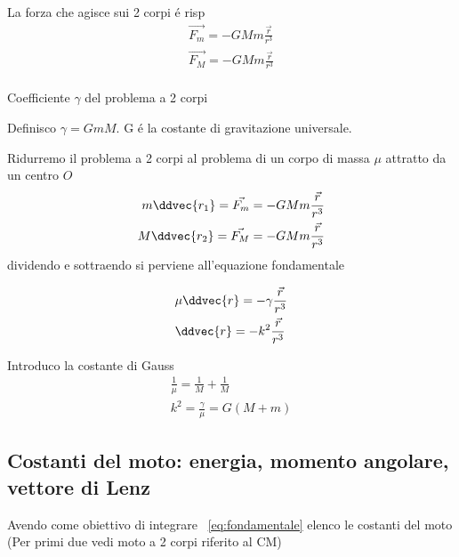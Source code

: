 La forza che agisce sui 2 corpi \'e risp
\begin{align*}
\vec{F_m}=-GMm\frac{\vec{r}}{r^3}\\
\vec{F_M}=-GMm\frac{\vec{r}}{r^3}\\
\end{align*}

\begin{definition}{Coefficiente $\gamma$ del problema a 2 corpi}

Definisco $\gamma=GmM$. G \'e la costante di gravitazione universale.

\end{definition}


Ridurremo il problema a 2 corpi al problema di un corpo di massa $\mu$ attratto da un centro $O$
\begin{align*}
m\ddvec{r_1}=\vec{F_m}=-GMm\frac{\vec{r}}{r^3}\\
M\ddvec{r_2}=\vec{F_M}=-GMm\frac{\vec{r}}{r^3}\\
\end{align*}
dividendo e sottraendo si perviene all'equazione fondamentale

\begin{align}
&\mu\ddvec{r}=-\gamma\frac{\vec{r}}{r^3}\label{eq:fondamentale}\\
&\ddvec{r}=-k^2\frac{\vec{r}}{r^3}
\end{align}

Introduco la costante di Gauss
\begin{align*}
\frac{1}{\mu}=\frac{1}{M}+\frac{1}{M}\\
k^2=\frac{\gamma}{\mu}=G(M+m)
\end{align*}

\subsection{Costanti del moto: energia, momento angolare, vettore di Lenz}
Avendo come obiettivo di integrare ~\ref{eq:fondamentale} elenco le costanti del moto (Per primi due vedi moto a 2 corpi riferito al CM)

